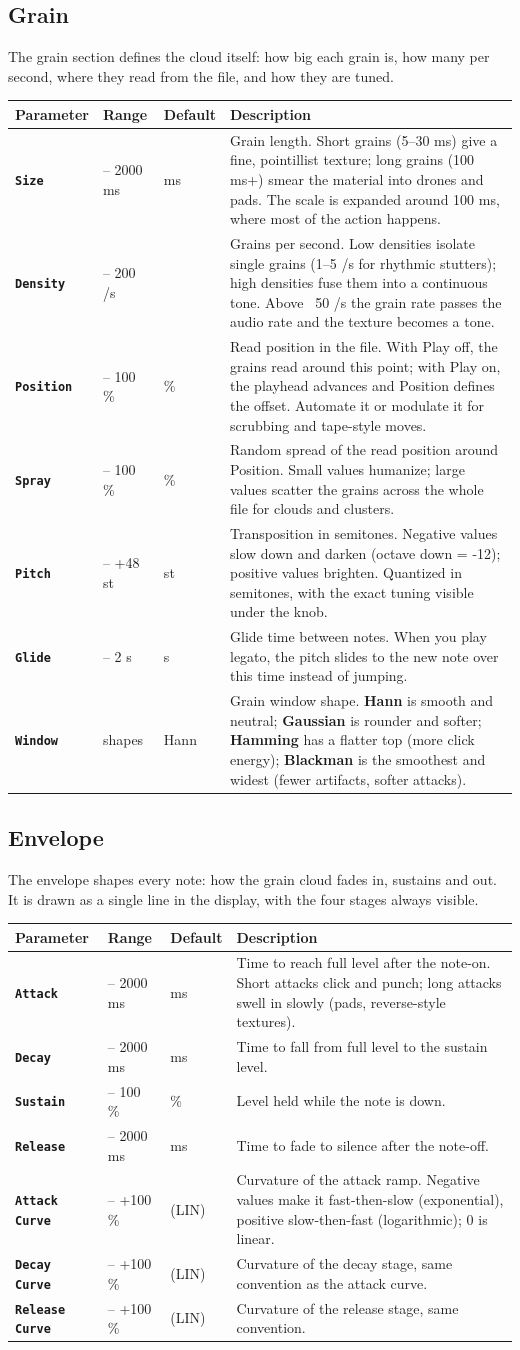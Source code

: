 \documentclass[11pt,a4paper]{article}
\makeatletter
\newcommand{\paramtable}[1]{%
  {\setlength{\tabcolsep}{3.5pt}\small
  \begin{tabular}{@{}>{\raggedright\arraybackslash}p{26mm}>{\raggedright\arraybackslash}p{25mm}>{\raggedright\arraybackslash}p{18mm}>{\raggedright\arraybackslash}p{\dimexpr\textwidth-69mm-21pt\relax}@{}}
  \toprule
  \textbf{Parameter} & \textbf{Range} & \textbf{Default} & \textbf{Description} \\
  \midrule
  #1
  \bottomrule
  \end{tabular}}}
\newcommand{\param}[4]{\texttt{\textbf{#1}} & #2 & #3 & #4 \\}
\makeatother
\begin{document}
\subsection{Grain}
The grain section defines the cloud itself: how big each grain is, how many
per second, where they read from the file, and how they are tuned.

\paramtable{
\param{Size}{1 -- 2000 ms}{40 ms}{Grain length. Short grains (5--30 ms) give a fine, pointillist texture; long grains (100 ms+) smear the material into drones and pads. The scale is expanded around 100 ms, where most of the action happens.}
\param{Density}{1 -- 200 /s}{20}{Grains per second. Low densities isolate single grains (1--5 /s for rhythmic stutters); high densities fuse them into a continuous tone. Above ~50 /s the grain rate passes the audio rate and the texture becomes a tone.}
\param{Position}{0 -- 100 \%}{50 \%}{Read position in the file. With Play off, the grains read around this point; with Play on, the playhead advances and Position defines the offset. Automate it or modulate it for scrubbing and tape-style moves.}
\param{Spray}{0 -- 100 \%}{0 \%}{Random spread of the read position around Position. Small values humanize; large values scatter the grains across the whole file for clouds and clusters.}
\param{Pitch}{-48 -- +48 st}{0 st}{Transposition in semitones. Negative values slow down and darken (octave down = -12); positive values brighten. Quantized in semitones, with the exact tuning visible under the knob.}
\param{Glide}{0 -- 2 s}{0 s}{Glide time between notes. When you play legato, the pitch slides to the new note over this time instead of jumping.}
\param{Window}{4 shapes}{Hann}{Grain window shape. \textbf{Hann} is smooth and neutral; \textbf{Gaussian} is rounder and softer; \textbf{Hamming} has a flatter top (more click energy); \textbf{Blackman} is the smoothest and widest (fewer artifacts, softer attacks).}
}

\subsection{Envelope}
The envelope shapes every note: how the grain cloud fades in, sustains and
out. It is drawn as a single line in the display, with the four stages
always visible.

\paramtable{
\param{Attack}{1 -- 2000 ms}{5 ms}{Time to reach full level after the note-on. Short attacks click and punch; long attacks swell in slowly (pads, reverse-style textures).}
\param{Decay}{1 -- 2000 ms}{100 ms}{Time to fall from full level to the sustain level.}
\param{Sustain}{0 -- 100 \%}{100 \%}{Level held while the note is down.}
\param{Release}{1 -- 2000 ms}{50 ms}{Time to fade to silence after the note-off.}
\param{Attack Curve}{-100 -- +100 \%}{0 (LIN)}{Curvature of the attack ramp. Negative values make it fast-then-slow (exponential), positive slow-then-fast (logarithmic); 0 is linear.}
\param{Decay Curve}{-100 -- +100 \%}{0 (LIN)}{Curvature of the decay stage, same convention as the attack curve.}
\param{Release Curve}{-100 -- +100 \%}{0 (LIN)}{Curvature of the release stage, same convention.}
}
\end{document}
